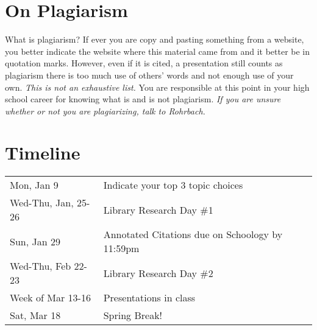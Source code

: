 \documentclass[11pt]{exam}
\begin{document}
\section*{On Plagiarism}
What is plagiarism? If ever you are copy and pasting something from a website, you better indicate the website where this material came from and it better be in quotation marks. However, even if it is cited, a presentation still counts as plagiarism there is too much use of others' words and not enough use of your own. \emph{This is not an exhaustive list.} You are responsible at this point in your high school career for knowing what is and is not plagiarism. \emph{If you are unsure whether or not you are plagiarizing, talk to Rohrbach.}

\section*{Timeline}

\begin{tabular}{ll}
  Mon, Jan 9 & 
  Indicate your top 3 topic choices
  \\[1em]
  Wed-Thu, Jan, 25-26 & 
  Library Research Day \#1
  \\[1em]
  Sun, Jan 29 & 
  Annotated Citations due on Schoology by 11:59pm
  \\[1em]
  Wed-Thu, Feb 22-23 & 
  Library Research Day \#2
  \\[1em]
  Week of Mar 13-16 & 
  Presentations in class
  \\[1em]
  Sat, Mar 18 &
  Spring Break!
\end{tabular}
 
\end{document}
